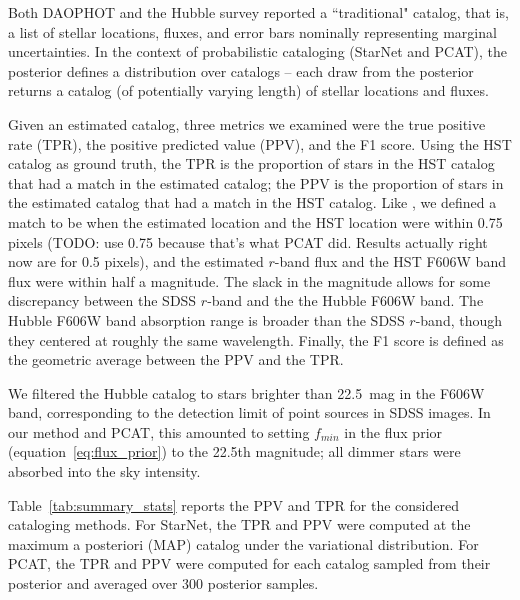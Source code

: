 Both DAOPHOT and the Hubble survey reported a ``traditional" catalog, that is, a list of stellar locations, fluxes, and 
error bars nominally representing marginal uncertainties.
In the context of probabilistic cataloging (StarNet and PCAT), the posterior 
defines a distribution over catalogs -- each draw from the posterior returns a catalog 
(of potentially varying length) of stellar locations and fluxes. 

Given an estimated catalog, three metrics we examined were the true positive rate (TPR), the positive predicted value (PPV), and the F1 score. Using the HST catalog as ground truth, the TPR is the proportion of stars in the HST catalog that had a match in the estimated catalog;
the PPV is the proportion of stars in the estimated catalog that had a match in the HST catalog. Like \cite{Portillo_2017, Feder_2019}, we defined a match to be when the estimated location and the HST location were within 0.75 pixels
(TODO: use 0.75 because that's what PCAT did. Results actually right now are for 0.5 pixels),
and the estimated $r$-band flux and the HST F606W band flux were within half a
magnitude. The slack in the magnitude allows for some discrepancy between the 
SDSS $r$-band and the the Hubble F606W band. The Hubble F606W band absorption range is broader than the SDSS $r$-band, though they centered at roughly the same wavelength. Finally, the F1 score is defined as the geometric average between the PPV and the TPR. 

We filtered the Hubble catalog to stars brighter than 22.5~mag in the F606W band, corresponding to the detection limit of point sources in SDSS images. In our method and PCAT, this amounted to setting $f_{min}$ in the flux prior (equation~\ref{eq:flux_prior})
to the 22.5th magnitude; all dimmer stars were absorbed into the sky intensity. 

Table~\ref{tab:summary_stats} reports the PPV and TPR for the considered cataloging methods.
For StarNet, the TPR and PPV were computed at the maximum a posteriori (MAP) catalog under
the variational distribution. For PCAT, the TPR and PPV were computed for each catalog sampled from their posterior and averaged over 300 posterior samples. 

